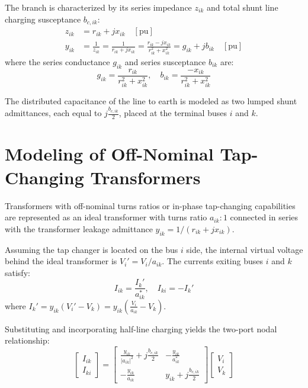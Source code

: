 \documentclass[12pt,a4paper,oneside]{report}
\begin{document}
The branch is characterized by its series impedance $z_{ik}$ and total shunt line charging susceptance $b_{c,ik}$:
\begin{align}
z_{ik} &= r_{ik} + j x_{ik} \quad [\text{pu}] \\
y_{ik} &= \frac{1}{z_{ik}} = \frac{1}{r_{ik} + j x_{ik}} = \frac{r_{ik} - j x_{ik}}{r_{ik}^2 + x_{ik}^2} = g_{ik} + j b_{ik} \quad [\text{pu}]
\end{align}
where the series conductance $g_{ik}$ and series susceptance $b_{ik}$ are:
\begin{equation}
g_{ik} = \frac{r_{ik}}{r_{ik}^2 + x_{ik}^2}, \quad b_{ik} = \frac{-x_{ik}}{r_{ik}^2 + x_{ik}^2}
\end{equation}

The distributed capacitance of the line to earth is modeled as two lumped shunt admittances, each equal to $j \frac{b_{c,ik}}{2}$, placed at the terminal buses $i$ and $k$.

\section{Modeling of Off-Nominal Tap-Changing Transformers}
Transformers with off-nominal turns ratios or in-phase tap-changing capabilities are represented as an ideal transformer with turns ratio $a_{ik}:1$ connected in series with the transformer leakage admittance $y_{ik} = 1/(r_{ik} + jx_{ik})$.

Assuming the tap changer is located on the bus $i$ side, the internal virtual voltage behind the ideal transformer is $V_i' = V_i / a_{ik}$. The currents exiting buses $i$ and $k$ satisfy:
\begin{equation}
I_{ik} = \frac{I_k'}{a_{ik}^*}, \quad I_{ki} = -I_k'
\end{equation}
where $I_k' = y_{ik} (V_i' - V_k) = y_{ik} \left( \frac{V_i}{a_{ik}} - V_k \right)$.

Substituting and incorporating half-line charging yields the two-port nodal relationship:
\begin{equation}
\begin{bmatrix}
I_{ik} \\ I_{ki}
\end{bmatrix}
=
\begin{bmatrix}
\frac{y_{ik}}{|a_{ik}|^2} + j \frac{b_{c,ik}}{2} & -\frac{y_{ik}}{a_{ik}^*} \\[8pt]
-\frac{y_{ik}}{a_{ik}} & y_{ik} + j \frac{b_{c,ik}}{2}
\end{bmatrix}
\begin{bmatrix}
V_i \\ V_k
\end{bmatrix}
\end{equation}
\end{document}
